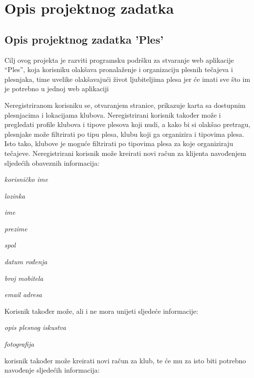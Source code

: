 \chapter{Opis projektnog zadatka}
\usepackage{graphicx}
\section{Opis projektnog zadatka 'Ples'}

Cilj ovog projekta je razviti programsku podršku za stvaranje web aplikacije “Ples”, koja korisniku olakšava pronalaženje i organizaciju plesnih tečajeva i plesnjaka, time uvelike olakšavajući život ljubiteljima plesa jer će imati sve što im je potrebno u jednoj web aplikaciji

Neregistriranom korisniku se, otvaranjem stranice, prikazuje karta sa dostupnim plesnjacima i lokacijama klubova. Neregistrirani korisnik također može i pregledati profile klubova i tipove plesova koji nudi, a kako bi si olakšao pretragu, plesnjake može filtrirati po tipu plesa, klubu koji ga organizira i tipovima plesa. Isto tako, klubove je moguće filtrirati po tipovima plesa za koje organiziraju tečajeve. 
	Neregistrirani korisnik može kreirati novi račun za klijenta navođenjem sljedećih obaveznih informacija:

\begin{packed_item}
	\item \textit{korisničko ime}
	\item \textit{lozinka}
	\item \textit{ime}
	\item \textit{prezime}
	\item \textit{spol}
	\item \textit{datum rođenja}
	\item \textit{broj mobitela}
	\item \textit{email adresa}
\end{packed_item}

Korisnik također može, ali i ne mora unijeti sljedeće informacije:

\begin{packed_item}
	\item \textit{opis plesnog iskustva}
	\item \textit{fotografija}
\end{packed_item}

\Neregistrirani korisnik također može kreirati novi račun za klub, te će mu za isto biti potrebno navođenje sljedećih informacija:

